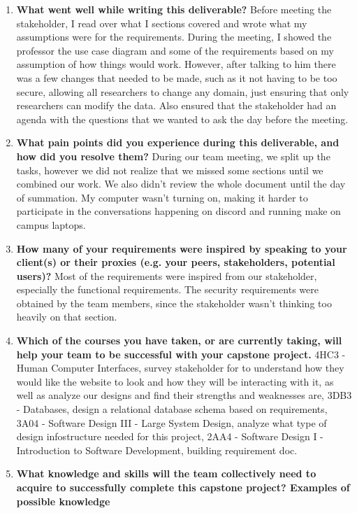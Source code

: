 \begin{enumerate}
  \item \textbf{What went well while writing this deliverable?} 
  Before meeting the stakeholder, I read over what I sections covered and wrote what my assumptions were for the requirements. During the meeting, I showed the professor the use case diagram and some of the requirements based on my assumption of how things would work. However, after talking to him there was a few changes that needed to be made, such as it not having to be too secure, allowing all researchers to change any domain, just ensuring that only researchers can modify the data. Also ensured that the stakeholder had an agenda with the questions that we wanted to ask the day before the meeting. 
  \item \textbf{What pain points did you experience during this deliverable, and how did
  you resolve them?}
  During our team meeting, we split up the tasks, however we did not realize that we missed some sections until we combined our work. We also didn't review the whole document until the day of summation. My computer wasn't turning on, making it harder to participate in the conversations happening on discord and running make on campus laptops.
  \item \textbf{How many of your requirements were inspired by speaking to your
  client(s) or their proxies (e.g. your peers, stakeholders, potential users)?}
  Most of the requirements were inspired from our stakeholder, especially the functional requirements. The security requirements were obtained by the team members, since the stakeholder wasn't thinking too heavily on that section. 
  \item \textbf{Which of the courses you have taken, or are currently taking, will help
  your team to be successful with your capstone project.}
  4HC3 - Human Computer Interfaces, survey stakeholder for to understand how they would like the website to look and how they will be interacting with it, as well as analyze our designs and find their strengths and weaknesses are, 3DB3 - Databases, design a relational database schema based on requirements, 3A04 - Software Design III - Large System Design, analyze what type of design infostructure needed for this project, 2AA4 - Software Design I - Introduction to Software Development, building requirement doc. 
  \item \textbf{What knowledge and skills will the team collectively need to acquire to
  successfully complete this capstone project?  Examples of possible knowledge
}
\end{enumerate}
